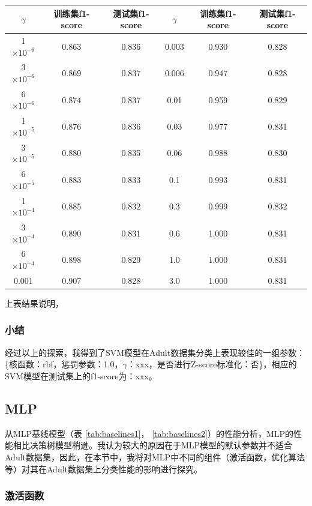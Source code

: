 \documentclass[12pt,a4paper]{article}
\theoremstyle{definition}
\begin{document}
{\begin{table}[H]
	\begin{tabular}{c|c|c||c|c|c}
		\centering
		$\gamma$ & 训练集f1-score & 测试集f1-score & $\gamma$ & 训练集f1-score & 测试集f1-score \\
		\hline
		\hline
		
		1 $\times 10^{-6}$  & 0.863 & 0.836 & 0.003 & 0.930 & 0.828 \\
		3 $\times 10^{-6}$ & 0.869 & 0.837 & 0.006 & 0.947 & 0.828 \\
		6 $\times 10^{-6}$ & 0.874 & 0.837 & 0.01 & 0.959 & 0.829 \\
		1 $\times 10^{-5}$  & 0.876 & 0.836 & 0.03 & 0.977 & 0.831 \\
		3 $\times 10^{-5}$ & 0.880 & 0.835 & 0.06 & 0.988 & 0.830 \\
		6 $\times 10^{-5}$ & 0.883 & 0.833 & 0.1 & 0.993 & 0.831 \\
		1 $\times 10^{-4}$ & 0.885 & 0.832 & 0.3 & 0.999 & 0.832 \\
		3 $\times 10^{-4}$ & 0.890 & 0.831 & 0.6 & 1.000 & 0.831 \\
		6 $\times 10^{-4}$ & 0.898 & 0.829 & 1.0 & 1.000 & 0.831 \\
		0.001 & 0.907 & 0.828 & 3.0 & 1.000 & 0.831 \\

	\end{tabular}
\end{table}

上表结果说明，

\subsubsection{小结}

经过以上的探索，我得到了SVM模型在Adult数据集分类上表现较佳的一组参数：\{核函数：rbf，惩罚参数：1.0，$\gamma$：xxx，是否进行Z-score标准化：否\}，相应的SVM模型在测试集上的f1-score为：xxx。

\subsection{MLP}

从MLP基线模型（表 \ref{tab:baselines1}， \ref{tab:baselines2}）的性能分析，MLP的性能相比决策树模型稍逊。我认为较大的原因在于MLP模型的默认参数并不适合Adult数据集，因此，在本节中，我将对MLP中不同的组件（激活函数，优化算法等）对其在Adult数据集上分类性能的影响进行探究。

\subsubsection{激活函数}

}
\end{document}
